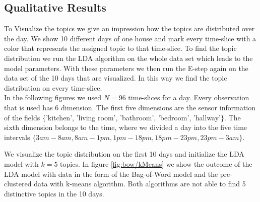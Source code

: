 \documentclass[11pt,a4paper]{article}
\begin{document}
\subsection{Qualitative Results}
To Visualize the topics we give an impression how the topics are distributed over the day. We show 10 different days of one house and mark every time-slice with a color that represents the assigned topic to that time-slice. To find the topic distribution we run the LDA algorithm on the whole data set which leads to the model parameters. With these parameters we then run the E-step again on the data set of the 10 days that are visualized. In this way we find the topic distribution on every time-slice.\\
In the following figures we used $N=96$ time-slices for a day. Every observation that is used has 6 dimension. The first five dimensions are the sensor information of the fields $\{$'kitchen', 'living room', 'bathroom', 'bedroom', 'hallway'$\}$. The sixth dimension belongs to the time, where we divided a day into the five time intervals $\{ 3am - 8am, 8am - 1pm, 1pm - 18pm, 18pm - 23pm, 23pm - 3am  \}$.

We visualize the topic distribution on the first 10 days and initialize the LDA model with $k=5$ topics. In figure \ref{fig:bow/kMeans} we show the outcome of the LDA model with data in the form of the Bag-of-Word model and the pre-clustered data with k-means algorithm. Both algorithms are not able to find 5 distinctive topics in the 10 days.\\
\end{document}
